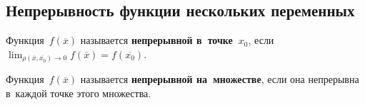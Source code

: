 \subsection{Непрерывность функции нескольких переменных}
Функция~$f(\overline x)$ называется \textbf{непрерывной в~точке~$x_0$}, если $\displaystyle \lim_{\rho(\overline x, \overline{x_0}) \to 0} f(\overline x) = f(\overline{x_0})$.

Функция~$f(\overline x)$ называется \textbf{непрерывной на~множестве}, если она непрерывна в~каждой точке этого множества.